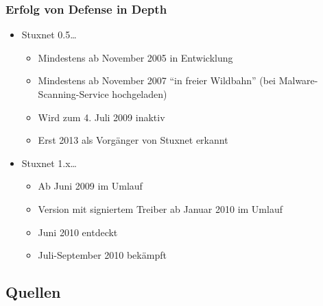 \documentclass{beamer}
\begin{document}
\begin{frame}
  \frametitle{Erfolg von Defense in Depth}
  \begin{itemize}
    \item Stuxnet 0.5\dots
      \begin{itemize}
        \item Mindestens ab November 2005 in Entwicklung
        \item Mindestens ab November 2007 ``in freier Wildbahn'' (bei Malware-Scanning-Service hochgeladen)
        \item Wird zum 4. Juli 2009 inaktiv
        \item Erst 2013 als Vorgänger von Stuxnet erkannt
      \end{itemize}
    \item Stuxnet 1.x\dots
      \begin{itemize}
        \item Ab Juni 2009 im Umlauf
        \item Version mit signiertem Treiber ab Januar 2010 im Umlauf
        \item Juni 2010 entdeckt
        \item Juli-September 2010 bekämpft
      \end{itemize}
  \end{itemize}
\end{frame}

\subsection{Quellen}
\end{document}
